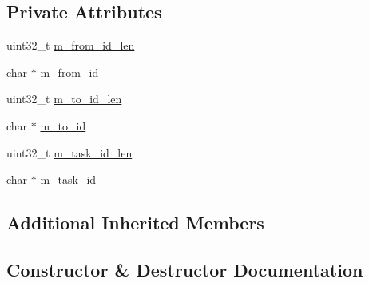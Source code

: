 \subsection*{Private Attributes}
\begin{DoxyCompactItemize}
\item 
uint32\+\_\+t \hyperlink{class_c_im_pdu_client_file_del_offline_req_a048388589991889aa784c0df15769187}{m\+\_\+from\+\_\+id\+\_\+len}
\item 
char $\ast$ \hyperlink{class_c_im_pdu_client_file_del_offline_req_aeb0cf50062d84a982f95cbbf0352f856}{m\+\_\+from\+\_\+id}
\item 
uint32\+\_\+t \hyperlink{class_c_im_pdu_client_file_del_offline_req_aa98ffa6d48542448c0558fac34cbc832}{m\+\_\+to\+\_\+id\+\_\+len}
\item 
char $\ast$ \hyperlink{class_c_im_pdu_client_file_del_offline_req_afa83dabf7fa7649c989a2ee855dc6e40}{m\+\_\+to\+\_\+id}
\item 
uint32\+\_\+t \hyperlink{class_c_im_pdu_client_file_del_offline_req_acdfabb194928428dddcecab011f7abbf}{m\+\_\+task\+\_\+id\+\_\+len}
\item 
char $\ast$ \hyperlink{class_c_im_pdu_client_file_del_offline_req_ae07b142217de4f33874cdf67c51e9013}{m\+\_\+task\+\_\+id}
\end{DoxyCompactItemize}
\subsection*{Additional Inherited Members}


\subsection{Constructor \& Destructor Documentation}
\hypertarget{class_c_im_pdu_client_file_del_offline_req_abefe79e5395429e1e81e31854e4a82d0}{}
